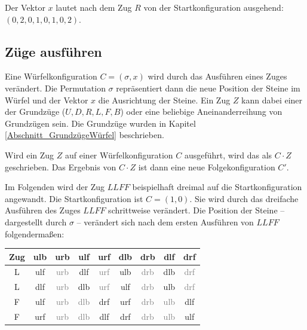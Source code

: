 \documentclass[12pt,a4paper, usenames, dvipsnames]{article}
\theoremstyle{mystyle}
\theoremstyle{definition}
\begin{document}
Der Vektor $x$ lautet nach dem Zug $R$ von der Startkonfiguration ausgehend: $(0, 2, 0, 1, 0, 1, 0, 2)$. 

%
%
%
%
%
%
%
%
%
%
\subsection{Züge ausführen}

\label{Abschnitt_ZuegeAusfuehren}

Eine Würfelkonfiguration $C=(\sigma, x)$ wird durch das Ausführen eines Zuges verändert.
Die Permutation $\sigma$ repräsentiert dann die neue Position der Steine im Würfel und der Vektor $x$ die Ausrichtung der Steine. Ein Zug $Z$ kann dabei einer der Grundzüge ($U,D,R,L,F,B$) oder eine beliebige Aneinanderreihung von Grundzügen sein. Die Grundzüge wurden in Kapitel \ref{Abschnitt_GrundzügeWürfel} beschrieben.

Wird ein Zug $Z$ auf einer Würfelkonfiguration $C$ ausgeführt, wird das als $C \cdot Z$ geschrieben. Das Ergebnis von $C \cdot Z$ ist dann eine neue Folgekonfiguration $C'$.

Im Folgenden wird der Zug $LLFF$ beispielhaft dreimal auf die Startkonfiguration angewandt. Die Startkonfiguration ist $C=(1,0)$. Sie wird durch das dreifache Ausführen des Zuges $LLFF$ schrittweise verändert.
Die Position der Steine -- dargestellt durch $\sigma$ -- verändert sich nach dem ersten Ausführen von $LLFF$ folgendermaßen:

\begin{center}
\begin{tabular}{ccccccccc}
\toprule
\textbf{Zug} & \textbf{ulb} & \textbf{urb} & \textbf{ulf} & \textbf{urf} & \textbf{dlb} & \textbf{drb} & \textbf{dlf} & \textbf{drf} \\
\midrule

L & ulf & \textcolor{gray}{urb} & dlf & \textcolor{gray}{urf} & ulb & \textcolor{gray}{drb} & dlb & \textcolor{gray}{drf} \\

L & dlf & \textcolor{gray}{urb} & dlb & \textcolor{gray}{urf} & ulf & \textcolor{gray}{drb} & ulb & \textcolor{gray}{drf} \\

F & ulf & \textcolor{gray}{urb} & \textcolor{gray}{dlb} & drf & urf & \textcolor{gray}{drb} & \textcolor{gray}{ulb} & dlf \\

F & urf & \textcolor{gray}{urb} & \textcolor{gray}{dlb} & dlf & drf & \textcolor{gray}{drb} & \textcolor{gray}{ulb} & ulf \\
\bottomrule
\end{tabular}
\end{center}
\end{document}
